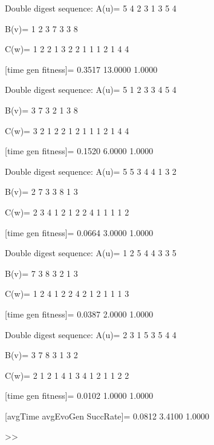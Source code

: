 Double digest sequence:
A(u)=
     5     4     2     3     1     3     5     4

B(v)=
     1     2     3     7     3     3     8

C(w)=
     1     2     2     1     3     2     2     1     1     1     2     1     4     4

[time gen fitness]=
    0.3517   13.0000    1.0000

Double digest sequence:
A(u)=
     5     1     2     3     3     4     5     4

B(v)=
     3     7     3     2     1     3     8

C(w)=
     3     2     1     2     2     1     2     1     1     1     2     1     4     4

[time gen fitness]=
    0.1520    6.0000    1.0000

Double digest sequence:
A(u)=
     5     5     3     4     4     1     3     2

B(v)=
     2     7     3     3     8     1     3

C(w)=
     2     3     4     1     2     1     2     2     4     1     1     1     1     2

[time gen fitness]=
    0.0664    3.0000    1.0000

Double digest sequence:
A(u)=
     1     2     5     4     4     3     3     5

B(v)=
     7     3     8     3     2     1     3

C(w)=
     1     2     4     1     2     2     4     2     1     2     1     1     1     3

[time gen fitness]=
    0.0387    2.0000    1.0000

Double digest sequence:
A(u)=
     2     3     1     5     3     5     4     4

B(v)=
     3     7     8     3     1     3     2

C(w)=
     2     1     2     1     4     1     3     4     1     2     1     1     2     2

[time gen fitness]=
    0.0102    1.0000    1.0000

[avgTime  avgEvoGen  SuccRate]=
    0.0812    3.4100    1.0000

>> 
